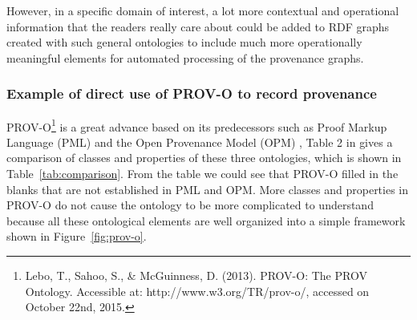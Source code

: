 However, in a specific domain of interest, a lot more contextual and operational information that the readers really care about could be added to RDF graphs created with such general ontologies to include much more operationally meaningful elements for automated processing of the provenance graphs.

\subsubsection{Example of direct use of PROV-O to record provenance}
PROV-O\footnote{Lebo, T., Sahoo, S., \& McGuinness, D. (2013). PROV-O: The PROV Ontology. Accessible at: http://www.w3.org/TR/prov-o/, accessed on October 22nd, 2015.} is a great advance based on its predecessors such as Proof Markup Language (PML) \cite{da2006proof} and the Open Provenance Model (OPM) \cite{moreau2011open}, Table 2 in \cite{ma2014ontology} gives a comparison of classes and properties of these three ontologies, which is shown in Table~\ref{tab:comparison}. From the table we could see that PROV-O filled in the blanks that are not established in PML and OPM. More classes and properties in PROV-O do not cause the ontology to be more complicated to understand because all these ontological elements are well organized into a simple framework shown in Figure~\ref{fig:prov-o}.
